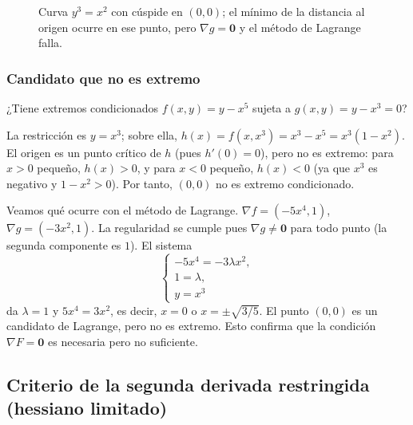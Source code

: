 \begin{figure}[H]
\centering
{}
\caption{Curva $y^3=x^2$ con cúspide en $(0,0)$; el mínimo de la distancia al origen ocurre en ese punto, pero $\nabla g=\mathbf{0}$ y el método de Lagrange falla.}
\end{figure}

\subsubsection{Candidato que no es extremo}

\begin{example}
¿Tiene extremos condicionados $f(x,y)=y-x^5$ sujeta a $g(x,y)=y-x^3=0$?
\end{example}

La restricción es $y=x^3$; sobre ella, $h(x)=f(x,x^3)=x^3-x^5=x^3(1-x^2)$. El origen es un punto crítico de $h$ (pues $h'(0)=0$), pero no es extremo: para $x>0$ pequeño, $h(x)>0$, y para $x<0$ pequeño, $h(x)<0$ (ya que $x^3$ es negativo y $1-x^2>0$). Por tanto, $(0,0)$ no es extremo condicionado.

Veamos qué ocurre con el método de Lagrange. $\nabla f=(-5x^4,1)$, $\nabla g=(-3x^2,1)$. La regularidad se cumple pues $\nabla g\neq\mathbf{0}$ para todo punto (la segunda componente es $1$). El sistema
\[
\begin{cases}
-5x^4 = -3\lambda x^2,\\
1 = \lambda,\\
y=x^3
\end{cases}
\]
da $\lambda=1$ y $5x^4=3x^2$, es decir, $x=0$ o $x=\pm\sqrt{3/5}$. El punto $(0,0)$ es un candidato de Lagrange, pero no es extremo. Esto confirma que la condición $\nabla F=\mathbf{0}$ es necesaria pero no suficiente.

\subsection{Criterio de la segunda derivada restringida (hessiano limitado)}

